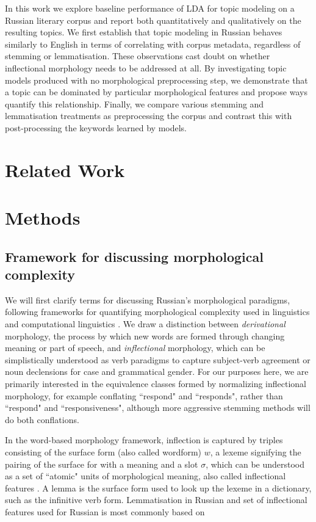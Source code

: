 \documentclass[11pt,a4paper]{article}
\begin{document}
In this work we explore baseline performance of LDA for topic modeling on a Russian literary corpus and report both quantitatively and qualitatively on the resulting topics. We first establish that topic modeling in Russian behaves similarly to English in terms of correlating with corpus metadata, regardless of stemming or lemmatisation. These observations cast doubt on whether inflectional morphology needs to be addressed at all. By investigating topic models produced with no morphological preprocessing step, we demonstrate that a topic can be dominated  by particular morphological features and propose ways quantify this relationship. Finally, we compare various stemming and lemmatisation treatments as preprocessing the corpus and contrast this with post-processing the keywords learned by models.

\section{Related Work}

\section{Methods}
\subsection{Framework for discussing morphological complexity}
We will first clarify terms for discussing Russian's morphological paradigms, following frameworks for quantifying morphological complexity used in linguistics and computational linguistics \cite{baerman2015intro, cotterell-etal-2019-complexity}. We draw a distinction between \textit{derivational} morphology, the process by which new words are formed through changing meaning or part of speech, and \textit{inflectional} morphology, which can be simplistically understood as verb paradigms to capture subject-verb agreement or noun declensions for case and grammatical gender. For our purposes here, we are primarily interested in the equivalence classes formed by normalizing inflectional morphology, for example conflating ``respond" and ``responds", rather than ``respond" and ``responsiveness", although more aggressive stemming methods will do both conflations.

In the word-based morphology framework, inflection is captured by triples consisting of the surface form (also called wordform) $w$, a lexeme signifying the pairing of the surface for with a meaning and a slot $\sigma$, which can be understood as a set of ``atomic" units of morphological meaning, also called inflectional features \cite{aronoff1976word,sylak-glassman-etal-2015-language,cotterell-etal-2019-complexity}.
A lemma is the surface form used to look up the lexeme in a dictionary, such as the infinitive verb form. Lemmatisation in Russian and set of inflectional features used for Russian is most commonly based on
\end{document}
